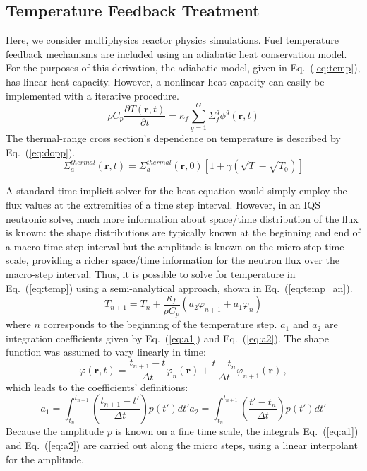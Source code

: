 \documentclass{elsarticle}
\renewcommand{\vec}[1]{\bm{#1}} %
\newcommand{\eqt}[1]{Eq.~(\ref{#1})}                     %
\newcommand{\be}{\begin{equation}}
\newcommand{\ee}{\end{equation}}
\begin{document}
\subsection{Temperature Feedback Treatment}

Here, we consider multiphysics reactor physics simulations.  Fuel temperature feedback mechanisms are included using an adiabatic heat conservation model. For the purposes of this derivation, the adiabatic model, given in \eqt{eq:temp}, has linear heat capacity. However, a nonlinear heat capacity can easily be implemented with a iterative procedure. 
\be
\rho C_p \frac{\partial T(\vec{r},t)}{\partial t} = \kappa_f \sum^G_{g=1}\Sigma_f^g \phi^g(\vec{r},t)
\label{eq:temp}
\ee
The thermal-range cross section's dependence on temperature is described by \eqt{eq:dopp}.
\be
\Sigma_a^{thermal}(\vec{r},t) = \Sigma_a^{thermal}(\vec{r},0)\left[1+\gamma\left(\sqrt{T}-\sqrt{T_0}\right)\right]
\label{eq:dopp}
\ee

A standard time-implicit solver for the heat equation would simply employ the flux values at the extremities of a time step interval.  However, in an IQS neutronic solve, much more information about space/time distribution of the flux is known: the shape distributions are typically known at the beginning and end of a macro time step interval but the amplitude is known on the micro-step time scale, providing a richer space/time information for the neutron flux over the macro-step interval. Thus, it is possible to solve for temperature in \eqt{eq:temp} using a semi-analytical approach, shown in \eqt{eq:temp_an}.
\be
T_{n+1} = T_n + \frac{\kappa_f}{\rho C_p} \left(a_2 \varphi_{n+1} + a_1 \varphi_{n}\right)
\label{eq:temp_an}
\ee
where $n$ corresponds to the beginning of the temperature step.  $a_1$ and $a_2$ are integration coefficients 
given by \eqt{eq:a1} and \eqt{eq:a2}.  The shape function was assumed to vary linearly in time:
\be
\varphi(\vec{r},t) = \frac{t_{n+1}-t}{\Delta t}\varphi_{n}(\vec{r}) + \frac{t-t_n}{\Delta t}\varphi_{n+1}(\vec{r})  \,,
\ee
which leads to the coefficients' definitions:
\begin{subequations}
\be
a_1 = \int_{t_n}^{t_{n+1}}\left(\frac{t_{n+1}-t'}{\Delta t}\right)p(t')dt'
\label{eq:a1}
\ee
\be
a_2 = \int_{t_n}^{t_{n+1}}\left(\frac{t'-t_n}{\Delta t}\right)p(t')dt'
\label{eq:a2}
\ee
\end{subequations}
Because the amplitude $p$ is known on a fine time scale, the integrals \eqt{eq:a1} and \eqt{eq:a2}
are carried out along the micro steps, using a linear interpolant for the amplitude.
\end{document}

